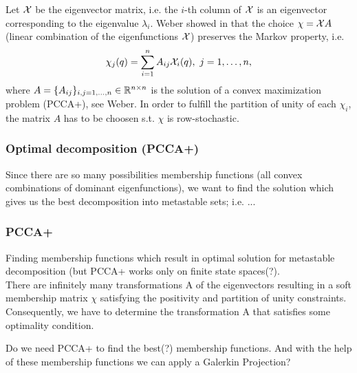 Let $\mathcal{X}$ be the eigenvector matrix,  i.e. the $i$-th column of $\mathcal{X}$ is an eigenvector corresponding to the eigenvalue $\lambda_i$. 
Weber showed in \cite{weber2011subspace} that the choice $\chi = \mathcal{X} A$ (linear combination of the eigenfunctions $\mathcal{X}$) preserves the Markov property, i.e.  
\begin{equation*}
\chi_j(q) = \sum_{i=1}^n A_{ij} \mathcal{X}_i(q), \ j=1,\dots,n,
\end{equation*}
where $A = \{A_{ij}\}_{i,j=1,\dots,n} \in \mathbb{R}^{n\times n}$ is the solution of a convex maximization problem (PCCA+), see Weber\cite{weber2006meshless}. In order to fulfill the partition of unity of each $\chi_i$, the matrix $A$ has to be choosen s.t. $\chi$ is row-stochastic.

\subsubsection*{Optimal decomposition (PCCA+)}

Since there are so many possibilities membership functions (all convex combinations of dominant eigenfunctions), we want to find the solution which gives us the best decomposition into metastable sets; i.e. ...



\subsubsection*{PCCA+}
Finding membership functions which result in optimal solution for metastable decomposition (but PCCA+ works only on finite state spaces(?).
\\

There are infinitely many transformations A of the eigenvectors resulting in a soft membership matrix
$\chi$ satisfying the positivity and partition of unity constraints.  Consequently, we have to determine the transformation A that satisfies some optimality condition.

Do we need PCCA+ to find the best(?) membership functions. And with the help of these membership functions we can apply a Galerkin Projection?